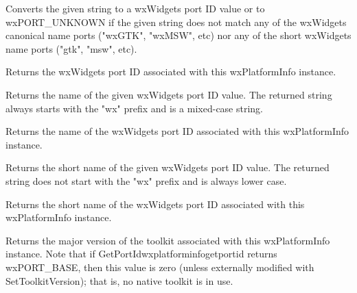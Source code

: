 
Converts the given string to a wxWidgets port ID value or to wxPORT_UNKNOWN if
the given string does not match any of the wxWidgets canonical name ports ("wxGTK", "wxMSW", etc)
nor any of the short wxWidgets name ports ("gtk", "msw", etc).


Returns the wxWidgets port ID associated with this wxPlatformInfo instance.

\label{wxplatforminfogetportidname}


Returns the name of the given wxWidgets port ID value. The returned string always starts with
the "wx" prefix and is a mixed-case string.


Returns the name of the wxWidgets port ID associated with this wxPlatformInfo instance.




\label{wxplatforminfogetportidshortname}


Returns the short name of the given wxWidgets port ID value. The returned string does not start with
the "wx" prefix and is always lower case.


Returns the short name of the wxWidgets port ID associated with this wxPlatformInfo instance.




\label{wxplatforminfogettoolkitmajorversion}


Returns the major version of the toolkit associated with this wxPlatformInfo instance.
Note that if {GetPortId}{wxplatforminfogetportid} returns wxPORT_BASE, then this value is zero (unless externally modified with SetToolkitVersion); that is, no native toolkit is in use.

\label{wxplatforminfogettoolkitminorversion}

